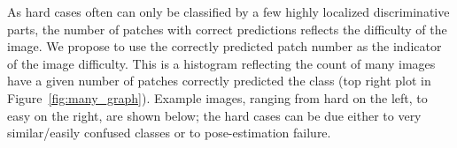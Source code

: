 \begin{comment}
We also identify hard cases by patch score.
If an image can be classified correctly by most of its patches,
then it belongs to the easy category.
Otherwise, it belongs to hard case category. 
The image difficulty distribution is shown in Figure ~\ref{fig:image_difficult}. This figure also provides sample images ranging from hard to easy. Note the increasingly cluttered background towards the difficult end.
\end{comment}

As hard cases often can only be classified by a few highly localized discriminative parts, the number of patches with correct predictions reflects the difficulty of the image. We propose to use the correctly predicted patch number as the indicator of the image difficulty. This is a histogram reflecting the count of many images have a given number of patches correctly predicted the class (top right plot in Figure~\ref{fig:many_graph}). Example images, ranging from hard on the left, to easy on the right, are shown below; the hard cases can be due either to very similar/easily confused classes or to pose-estimation failure.

\begin{comment}
\subsection{Patch Size Study} \label{sec:patch-size}
\pei{Patch size is an important hyper parameter in our experiment. 
To study its affect on the patch classifier accuracy, 
we choose the \patchpair{crown}{left-leg} patch and run ResNet-50 on 4 different sizes of input. 
Results are shown in Table~\ref{patch-size-table}
We find generally larger patch will get better accuracy score. 
We choose 256 $\times$ 512 also because our ResNet-50 models are pretrained on such resolution on ImageNet dataset.}
\end{comment}




